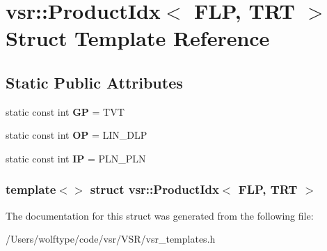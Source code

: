\hypertarget{structvsr_1_1_product_idx_3_01_f_l_p_00_01_t_r_t_01_4}{\section{vsr\-:\-:Product\-Idx$<$ F\-L\-P, T\-R\-T $>$ Struct Template Reference}
\label{structvsr_1_1_product_idx_3_01_f_l_p_00_01_t_r_t_01_4}
}
\subsection*{Static Public Attributes}
\begin{DoxyCompactItemize}
\item 
\hypertarget{structvsr_1_1_product_idx_3_01_f_l_p_00_01_t_r_t_01_4_a422e9a25776ead8205586e6840c8de7a}{static const int {\bfseries G\-P} = T\-V\-T}\label{structvsr_1_1_product_idx_3_01_f_l_p_00_01_t_r_t_01_4_a422e9a25776ead8205586e6840c8de7a}

\item 
\hypertarget{structvsr_1_1_product_idx_3_01_f_l_p_00_01_t_r_t_01_4_aa2c05c8c6b21d3870cfc868b5ae549e8}{static const int {\bfseries O\-P} = L\-I\-N\-\_\-\-D\-L\-P}\label{structvsr_1_1_product_idx_3_01_f_l_p_00_01_t_r_t_01_4_aa2c05c8c6b21d3870cfc868b5ae549e8}

\item 
\hypertarget{structvsr_1_1_product_idx_3_01_f_l_p_00_01_t_r_t_01_4_ae57fa32c8e9f8da96bf2b4ea837b3d59}{static const int {\bfseries I\-P} = P\-L\-N\-\_\-\-P\-L\-N}\label{structvsr_1_1_product_idx_3_01_f_l_p_00_01_t_r_t_01_4_ae57fa32c8e9f8da96bf2b4ea837b3d59}

\end{DoxyCompactItemize}
\subsubsection*{template$<$$>$ struct vsr\-::\-Product\-Idx$<$ F\-L\-P, T\-R\-T $>$}



The documentation for this struct was generated from the following file\-:\begin{DoxyCompactItemize}
\item 
/\-Users/wolftype/code/vsr/\-V\-S\-R/vsr\-\_\-templates.\-h\end{DoxyCompactItemize}
